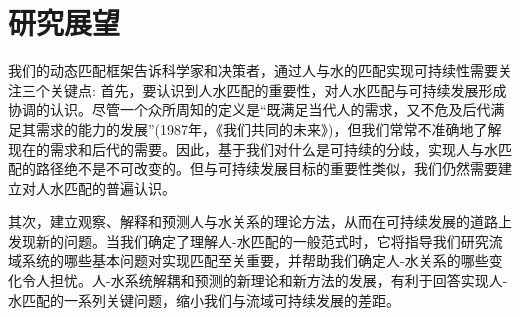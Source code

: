 \section{研究展望}

我们的动态匹配框架告诉科学家和决策者，通过人与水的匹配实现可持续性需要关注三个关键点:
首先，要认识到人水匹配的重要性，对人水匹配与可持续发展形成协调的认识。尽管一个众所周知的定义是“既满足当代人的需求，又不危及后代满足其需求的能力的发展”(1987年，《我们共同的未来》)，但我们常常不准确地了解现在的需求和后代的需要。因此，基于我们对什么是可持续的分歧，实现人与水匹配的路径绝不是不可改变的。但与可持续发展目标的重要性类似，我们仍然需要建立对人水匹配的普遍认识。

其次，建立观察、解释和预测人与水关系的理论方法，从而在可持续发展的道路上发现新的问题。当我们确定了理解人-水匹配的一般范式时，它将指导我们研究流域系统的哪些基本问题对实现匹配至关重要，并帮助我们确定人-水关系的哪些变化令人担忧。人-水系统解耦和预测的新理论和新方法的发展，有利于回答实现人-水匹配的一系列关键问题，缩小我们与流域可持续发展的差距。

